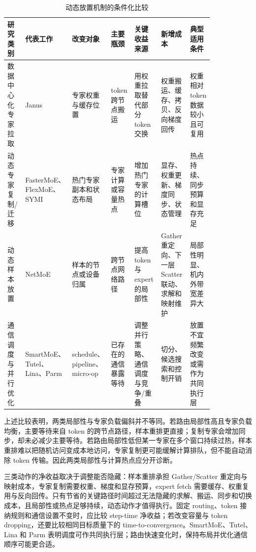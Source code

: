 \begin{table}[!t]
\centering
\caption{动态放置机制的条件化比较}
\label{tab:mechanism-comparison}
\footnotesize
\setlength{\tabcolsep}{2pt}
\renewcommand{\arraystretch}{1.12}
\begin{tabularx}{\linewidth}{>{\raggedright\arraybackslash}p{0.12\linewidth} >{\raggedright\arraybackslash}p{0.11\linewidth} >{\raggedright\arraybackslash}p{0.14\linewidth} >{\raggedright\arraybackslash}p{0.12\linewidth} >{\raggedright\arraybackslash}p{0.16\linewidth} >{\raggedright\arraybackslash}p{0.18\linewidth} >{\raggedright\arraybackslash}X}
\toprule
研究类别 & 代表工作 & 改变对象 & 主要瓶颈 & 关键收益来源 & 新增成本 & 典型适用条件 \\
\midrule
数据中心化专家拉取 & Janus\cite{ref1} & 专家权重与缓存位置 & token 跨节点搬运 & 用权重拉取替代部分 token 交换 & 权重搬运、缓存、拷贝、反向梯度回传 & 权重相对 token 数据较小且可复用 \\
动态专家复制/迁移 & FasterMoE\cite{ref5}、FlexMoE\cite{ref2}、SYMI\cite{ref4} & 热门专家副本和状态布局 & 专家计算或容量热点 & 增加热门专家的计算槽位 & 显存、权重更新、梯度同步、状态管理 & 热点持续、同步预算和显存充足 \\
动态样本放置 & NetMoE\cite{ref3} & 样本的节点或设备归属 & 跨节点网络路径 & 提高 token 与 expert 的局部性 & Gather 重定向、下一层 Scatter 联动、求解和映射维护 & 局部性明显、机内外带宽差异大 \\
通信调度与并行优化 & SmartMoE\cite{ref6}、Tutel\cite{ref7}、Lina\cite{ref8}、Parm\cite{ref9} & schedule、pipeline、micro-op & 已存在的通信暴露等待 & 调整并行策略、通信调度与竞争/重叠 & 切分、候选搜索和控制开销 & 放置不宜频繁改变或需作为共同执行层 \\
\bottomrule
\end{tabularx}
\end{table}

上述比较表明，两类局部性与专家负载偏斜并不等同。若路由局部性高且专家负载均衡，主要等待来自 token 的跨节点路径，样本重排更直接；复制专家会增加同步，却未必减少主要等待。若路由局部性低但某一专家在多个窗口持续过热，样本重排难以把随机访问变成本地访问，专家复制更可能缓解计算排队，但不能自动消除 token 传输。因此两类局部性与计算热点应分开诊断。

三类动作的净收益取决于调整能否隐藏：样本重排承担 Gather/Scatter 重定向与映射成本，专家复制需要权重、梯度和显存预算，expert fetch 需要缓存、权重复用与反向回传。只有节省的关键路径时间超过无法隐藏的求解、搬运、同步和切换成本，且局部性或热点足够持续，动态动作才值得执行。固定 routing、token 接纳规则和通信设置不变时，应比较 step-time 净收益；若改变容量与 token dropping，还要比较相同目标质量下的 time-to-convergence。SmartMoE、Tutel、Lina 和 Parm 表明调度可作共同执行层；路由快速变化时，保持布局并优化通信顺序可能更合适。

